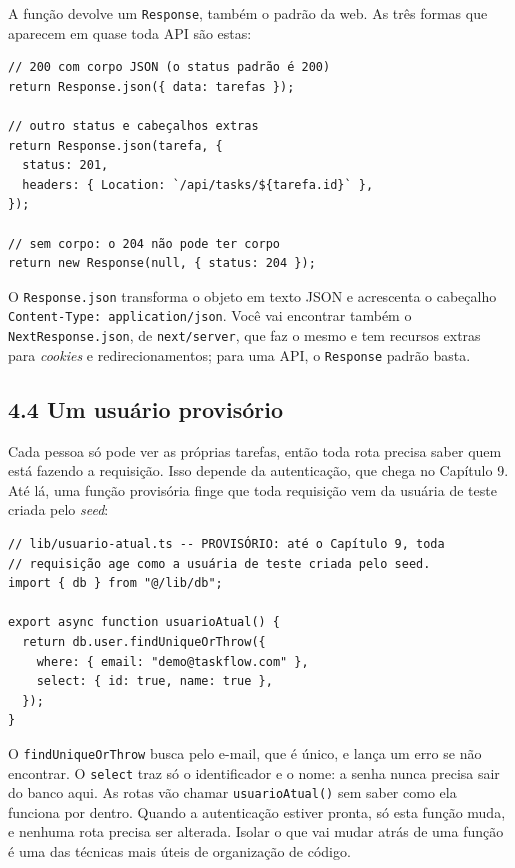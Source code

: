 A função devolve um \texttt{Response}, também o padrão da web. As três formas que aparecem em quase toda API são estas:

\begin{codigo}
\begin{Verbatim}[breaklines=true, breaksymbolleft={}, fontsize=\footnotesize]
// 200 com corpo JSON (o status padrão é 200)
return Response.json({ data: tarefas });

// outro status e cabeçalhos extras
return Response.json(tarefa, {
  status: 201,
  headers: { Location: `/api/tasks/${tarefa.id}` },
});

// sem corpo: o 204 não pode ter corpo
return new Response(null, { status: 204 });
\end{Verbatim}
\end{codigo}

O \texttt{Response.json} transforma o objeto em texto JSON e acrescenta o cabeçalho \texttt{Content-Type: application/json}. Você vai encontrar também o \texttt{NextResponse.json}, de \texttt{next/server}, que faz o mesmo e tem recursos extras para \textit{cookies} e redirecionamentos; para uma API, o \texttt{Response} padrão basta.

\subsection{4.4 Um usuário provisório}

Cada pessoa só pode ver as próprias tarefas, então toda rota precisa saber quem está fazendo a requisição. Isso depende da autenticação, que chega no Capítulo 9. Até lá, uma função provisória finge que toda requisição vem da usuária de teste criada pelo \textit{seed}:

\begin{codigo}
\begin{Verbatim}[breaklines=true, breaksymbolleft={}, fontsize=\footnotesize]
// lib/usuario-atual.ts -- PROVISÓRIO: até o Capítulo 9, toda
// requisição age como a usuária de teste criada pelo seed.
import { db } from "@/lib/db";

export async function usuarioAtual() {
  return db.user.findUniqueOrThrow({
    where: { email: "demo@taskflow.com" },
    select: { id: true, name: true },
  });
}
\end{Verbatim}
\end{codigo}

O \texttt{findUniqueOrThrow} busca pelo e-mail, que é único, e lança um erro se não encontrar. O \texttt{select} traz só o identificador e o nome: a senha nunca precisa sair do banco aqui. As rotas vão chamar \texttt{usuarioAtual()} sem saber como ela funciona por dentro. Quando a autenticação estiver pronta, só esta função muda, e nenhuma rota precisa ser alterada. Isolar o que vai mudar atrás de uma função é uma das técnicas mais úteis de organização de código.

